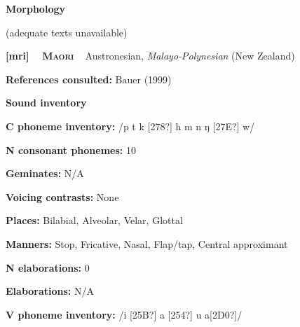 \begin{styleBody}
\textbf{Morphology}
\end{styleBody}

\begin{styleBody}
(adequate texts unavailable)
\end{styleBody}

\clearpage\begin{styleBody}
\textbf{[mri] }\ \ \textbf{\textsc{Maori}}\textbf{\ \ }Austronesian, \textit{Malayo-Polynesian} (New Zealand)
\end{styleBody}

\begin{styleBody}
\textbf{References consulted: }Bauer (1999)
\end{styleBody}

\begin{styleBody}
\textbf{Sound inventory}
\end{styleBody}

\begin{styleBody}
\textbf{C phoneme inventory:} /p t k [278?] h m n ŋ [27E?] w/
\end{styleBody}

\begin{styleBody}
\textbf{N consonant phonemes:} 10
\end{styleBody}

\begin{styleBody}
\textbf{Geminates:} N/A
\end{styleBody}

\begin{styleBody}
\textbf{Voicing contrasts:} None
\end{styleBody}

\begin{styleBody}
\textbf{Places:} Bilabial, Alveolar, Velar, Glottal
\end{styleBody}

\begin{styleBody}
\textbf{Manners:} Stop, Fricative, Nasal, Flap/tap, Central approximant
\end{styleBody}

\begin{styleBody}
\textbf{N elaborations:} 0
\end{styleBody}

\begin{styleBody}
\textbf{Elaborations:} N/A
\end{styleBody}

\begin{styleBody}
\textbf{V phoneme inventory:} /i [25B?] a [254?] u a[2D0?]/
\end{styleBody}

